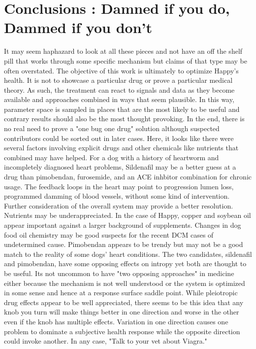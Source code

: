 \section{Conclusions : Damned if you do, Dammed if you don't }
It may seem haphazard to look at all these pieces and not
have an off the shelf pill that works through some specific mechanism
but claims of that type may be often overstated.
The objective of this work  is ultimately to optimize Happy's health.
It is not to showcase a particular drug or prove a particular
medical theory. As such, the treatment can react to signals 
and data as they become available and approaches combined
in ways that seem plausible. In this way, parameter space
is sampled in places that are the most likely to be
useful and contrary results should also be the most thought provoking.
In the end, there is no real need to prove a "one bug one drug" solution
although suspected contributors could be sorted out in later cases. 
Here, it looks like there were several factors involving
explicit drugs and other chemicals like nutrients that 
combined may have helped. 
For a dog with a history of heartworm and incompletely diagnosed
heart problems, Sildenafil may be a better guess at a drug 
than pimobendan, furosemide, and an ACE inhbitor combination for chronic
usage.
The feedback loops in the heart may point to progression lumen 
loss, programmed damming of blood vessels,  without some kind of intervention. 
Further consideration of
the overall system may provide a better resolution.
Nutrients may be underappreciated. 
In the case
of Happy, copper and soybean oil appear important against a larger
background of supplements. Changes in dog food oil chemistry may be
good suspects for the recent DCM cases of undetermined cause.  
Pimobendan appears to be trendy but may not be a good match
to the reality of some dogs' heart  conditions. 
The two candidates, sildenafil and pimobendan,  have some opposing effects
on intropy  yet both are thought to be useful. Its not uncommon to
have "two opposing approaches" in medicine either because the
mechanism is not well understood or the system is optimized
in some sense and hence at a response surface saddle point.
While pleiotropic drug effects appear to be well appreciated,
there seems to be this idea that any knob you turn will make
things better in one direction and worse in the other even if
the knob has multiple effects.  
Variation in one direction causes one problem to dominate a subjective
health response while the opposite direction could invoke another.
In any case, "Talk to your vet about Viagra."

